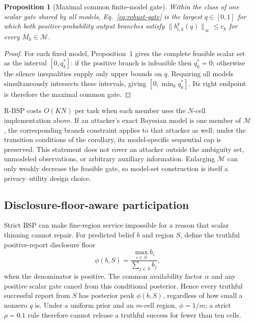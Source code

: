 \documentclass[review,12pt]{elsarticle}
\newtheorem{proposition}{Proposition}
\begin{document}
\begin{proposition}[Maximal common finite-model gate]
Within the class of one scalar gate shared by all models, Eq.~\eqref{eq:robust-gate} is the largest $q\in[0,1]$ for which both positive-probability output branches satisfy $\|b_{t,k}^{y}(q)\|_\infty\le c_k$ for every $M_k\in\mathcal M$.
\end{proposition}
\begin{proof}
For each fixed model, Proposition~1 gives the complete feasible scalar set as the interval $[0,q_k^*]$: if the positive branch is infeasible then $q_k^*=0$; otherwise the silence inequalities supply only upper bounds on $q$. Requiring all models simultaneously intersects these intervals, giving $[0,\min_k q_k^*]$. Its right endpoint is therefore the maximal common gate.
\end{proof}

R-BSP costs $O(KN)$ per task when each member uses the $N$-cell implementation above. If an attacker's exact Bayesian model is one member of $\mathcal M$, the corresponding branch constraint applies to that attacker as well; under the transition conditions of the corollary, its model-specific sequential cap is preserved. This statement does not cover an attacker outside the ambiguity set, unmodeled observations, or arbitrary auxiliary information. Enlarging $\mathcal M$ can only weakly decrease the feasible gate, so model-set construction is itself a privacy--utility design choice.

\subsection{Disclosure-floor-aware participation}
\label{sec:dfbsp}
Strict BSP can make fine-region service impossible for a reason that scalar thinning cannot repair. For predicted belief $b$ and region $S$, define the truthful positive-report disclosure floor
\begin{equation}
 \phi(b,S)=\frac{\max_{i\in S}b_i}{\sum_{j\in S}b_j},
 \label{eq:floor}
\end{equation}
when the denominator is positive. The common availability factor $\alpha$ and any positive scalar gate cancel from this conditional posterior. Hence every truthful successful report from $S$ has posterior peak $\phi(b,S)$, regardless of how small a nonzero $q$ is. Under a uniform prior and an $m$-cell region, $\phi=1/m$; a strict $\rho=0.1$ rule therefore cannot release a truthful success for fewer than ten cells.
\end{document}
